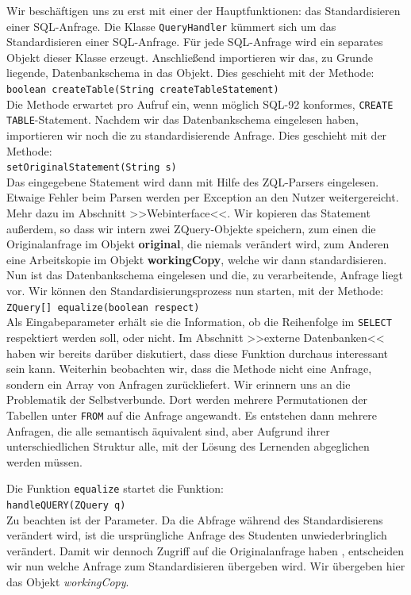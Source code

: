 Wir beschäftigen uns zu erst mit einer der Hauptfunktionen: das Standardisieren einer SQL-Anfrage. Die Klasse \verb|QueryHandler| kümmert sich um das Standardisieren einer SQL-Anfrage. Für jede SQL-Anfrage wird ein separates Objekt dieser Klasse erzeugt. Anschließend importieren wir das, zu Grunde liegende, Datenbankschema in das Objekt. Dies geschieht mit der Methode: \\\verb|boolean createTable(String createTableStatement)|\\
Die Methode erwartet pro Aufruf ein, wenn möglich SQL-92 konformes, \verb|CREATE TABLE|-Statement. Nachdem wir das Datenbankschema eingelesen haben, importieren wir noch die zu standardisierende Anfrage. Dies geschieht mit der Methode:\\\verb|setOriginalStatement(String s)|\\ Das eingegebene Statement wird dann mit Hilfe des ZQL-Parsers eingelesen. Etwaige Fehler beim Parsen werden per Exception an den Nutzer weitergereicht. Mehr dazu im Abschnitt >>Webinterface<<. Wir kopieren das Statement außerdem, so dass wir intern zwei ZQuery-Objekte speichern, zum einen die Originalanfrage im Objekt \textbf{original}, die niemals verändert wird, zum Anderen eine Arbeitskopie im Objekt \textbf{workingCopy}, welche wir dann standardisieren. Nun ist das Datenbankschema eingelesen und die, zu verarbeitende, Anfrage liegt vor. Wir können den Standardisierungsprozess nun starten, mit der Methode: \\\verb|ZQuery[] equalize(boolean respect)|\\ 
Als Eingabeparameter erhält sie die Information, ob die Reihenfolge im \verb|SELECT| respektiert werden soll, oder nicht. Im Abschnitt >>externe Datenbanken<< haben wir bereits darüber diskutiert, dass diese Funktion durchaus interessant sein kann. Weiterhin beobachten wir, dass die Methode nicht eine Anfrage, sondern ein Array von Anfragen zurückliefert. Wir erinnern uns an die Problematik der Selbstverbunde. Dort werden mehrere Permutationen der Tabellen unter \verb|FROM| auf die Anfrage angewandt. Es entstehen dann mehrere Anfragen, die alle semantisch äquivalent sind, aber Aufgrund ihrer unterschiedlichen Struktur alle, mit der Lösung des Lernenden abgeglichen werden müssen.

Die Funktion \verb|equalize| startet die Funktion:\\
\verb|handleQUERY(ZQuery q)|\\Zu beachten ist der Parameter. Da die Abfrage während des Standardisierens verändert wird, ist die ursprüngliche Anfrage des Studenten unwiederbringlich verändert. Damit wir dennoch Zugriff auf die Originalanfrage haben , entscheiden wir nun welche Anfrage zum Standardisieren übergeben wird. Wir übergeben hier das Objekt \textit{workingCopy}.


